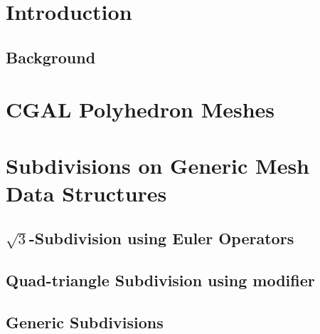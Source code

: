 \documentclass{egpubl}
\begin{document}

\section{Introduction}

\subsection{Background}
 

\section{CGAL Polyhedron Meshes}
 

\section{Subdivisions on Generic Mesh Data Structures}


\subsection{$\sqrt{3}$-Subdivision using Euler Operators}

\subsection{Quad-triangle Subdivision using modifier}


\subsection{Generic Subdivisions}

\end{document}
